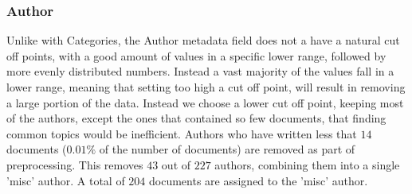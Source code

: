 \subsubsection{Author}\label{subsec:appendix_author}
Unlike with Categories, the Author metadata field does not a have a natural cut off points, with a good amount of values in a specific lower range, followed by more evenly distributed numbers.
Instead a vast majority of the values fall in a lower range, meaning that setting too high a cut off point, will result in removing a large portion of the data.
Instead we choose a lower cut off point, keeping most of the authors, except the ones that contained so few documents, that finding common topics would be inefficient.
Authors who have written less that $14$ documents ($0.01\%$ of the number of documents) are removed as part of preprocessing.
This removes $43$ out of $227$ authors, combining them into a single 'misc' author.
A total of $204$ documents are assigned to the 'misc' author.

